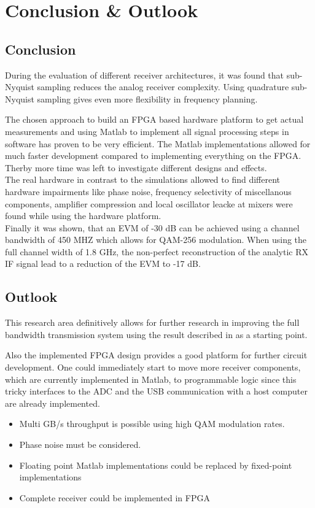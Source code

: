 \chapter{Conclusion \& Outlook}
\section{Conclusion}
During the evaluation of different receiver architectures, it was found
that sub-Nyquist sampling reduces the analog receiver complexity.
Using quadrature sub-Nyquist sampling gives even more flexibility in frequency
planning.

The chosen approach to build an \gls{FPGA} based hardware platform to get
actual measurements and using Matlab to implement all signal processing steps
in software has proven to be very efficient. The Matlab implementations
allowed for much faster development compared to implementing everything on the
\gls{FPGA}. Therby more time was left to investigate different designs and
effects. \\

The real hardware in contrast to the simulations allowed to find
different hardware impairments like phase noise, frequency selectivity of
miscellanous components, amplifier compression and local oscillator leacke at
mixers were found while using the hardware platform. \\

Finally it was shown, that an \gls{EVM} of -30 dB can be achieved using a channel
bandwidth of 450 MHZ which allows for \gls{QAM}-256 modulation.
When using the full channel width of 1.8 GHz, the non-perfect
reconstruction of the analytic \gls{RX} \gls{IF} signal lead to a reduction of the
\gls{EVM} to -17 dB. 


\section{Outlook}
This research area definitively allows for further research in improving
the full bandwidth transmission system using the result described in
 as a starting point.

Also the implemented \gls{FPGA} design provides a good platform
for further circuit development. One could immediately start to
move more receiver components, which are currently implemented in Matlab,
to programmable logic since this tricky interfaces to the \gls{ADC}
and the \gls{USB} communication with a host computer are already implemented.





\begin{itemize}
\item Multi GB/s throughput is possible using high \gls{QAM} modulation rates.
\item Phase noise must be considered.
\item Floating point Matlab implementations could be replaced by fixed-point implementations
\item Complete receiver could be implemented in \gls{FPGA}
\end{itemize}

